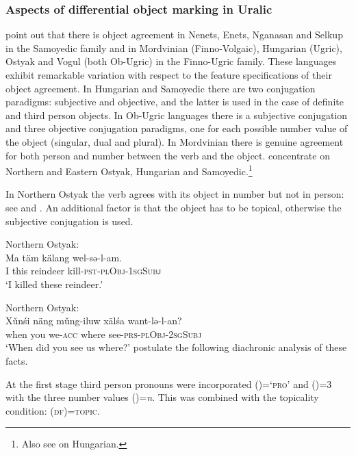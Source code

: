 \documentclass[output=paper,hidelinks]{langscibook}
\begin{document}
\subsubsection{Aspects of differential object marking in Uralic}
\label{sec:FinnoUgric:7.1.2}

\citet{CoppockWechsler2010} point out that there is object agreement in Nenets, Enets, Nganasan and Selkup in the Samoyedic family and in Mordvinian (Finno-Volgaic), Hungarian (Ugric), Ostyak and Vogul (both Ob-Ugric) in the Finno-Ugric family. These languages exhibit remarkable variation with respect to the feature specifications of their object agreement. In Hungarian and Samoyedic there are two conjugation paradigms: subjective and objective, and the latter is used in the case of definite and third person objects. In Ob-Ugric languages there is a subjective conjugation and three objective conjugation paradigms, one for each possible number value of the object (singular, dual and plural). In Mordvinian there is genuine agreement for both person and number between the verb and the object. \citet{CoppockWechsler2010} concentrate on Northern and Eastern Ostyak, Hungarian and Samoyedic.\footnote{Also see \citet{CoppockWechsler2012} on Hungarian.}

In Northern Ostyak the verb agrees with its object in number but not in person: see  and . An additional factor is that the object has to be topical, otherwise the subjective conjugation is used.

\ea%
    \label{ex:FinnoUgric:55}Northern Ostyak:\\
    \gll Ma täm kälang wel-sə-l-am.\\
        I this reindeer kill-\textsc{pst-plObj-1sgSubj}\\
    \glt `I killed these reindeer.'
    \z

\ea%
    \label{ex:FinnoUgric:56}Northern Ostyak:\\
    \gll Xǔnśi näng mǔng-iluw xälśa want-lə-l-an?\\
       when you we-\textsc{acc} where see-\textsc{prs-plObj-2sgSubj}\\
    \glt `When did you see us where?'
    \z
\citet{CoppockWechsler2010} postulate the following diachronic analysis of these facts. 

At the first stage third person pronouns were incorporated (\DOWN\PRED)=\textsc{`pro'} and (\DOWN\NINDEX\PERS)=3 with the three number values (\DOWN\NINDEX\NUM)=\textit{n}. This was combined with the topicality condition: (\DOWNS\textsc{df})=\textsc{topic.}
\end{document}
